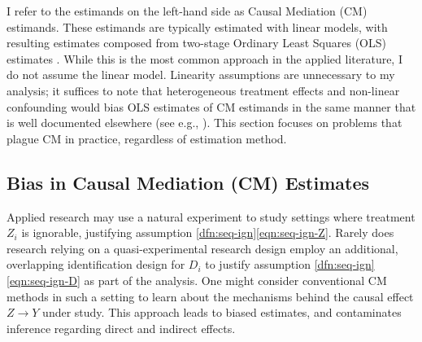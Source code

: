 I refer to the estimands on the left-hand side as Causal Mediation (CM) estimands.
These estimands are typically estimated with linear models, with resulting estimates composed from two-stage Ordinary Least Squares (OLS) estimates \citep{imai2010identification}.
While this is the most common approach in the applied literature, I do not assume the linear model.
Linearity assumptions are unnecessary to my analysis; it suffices to note that heterogeneous treatment effects and non-linear confounding would bias OLS estimates of CM estimands in the same manner that is well documented elsewhere (see e.g., \citealt{angrist1998estimating,sloczynski2022interpreting}).
This section focuses on problems that plague CM in practice, regardless of estimation method.

\subsection{Bias in Causal Mediation (CM) Estimates}
Applied research may use a natural experiment to study settings where treatment $Z_i$ is ignorable, justifying assumption \ref{dfn:seq-ign}\eqref{eqn:seq-ign-Z}.
Rarely does research relying on a quasi-experimental research design employ an additional, overlapping identification design for $D_i$ to justify assumption \ref{dfn:seq-ign}\eqref{eqn:seq-ign-D} as part of the analysis.
One might consider conventional CM methods in such a setting to learn about the mechanisms behind the causal effect $Z \to Y$ under study.
This approach leads to biased estimates, and contaminates inference regarding direct and indirect effects.

